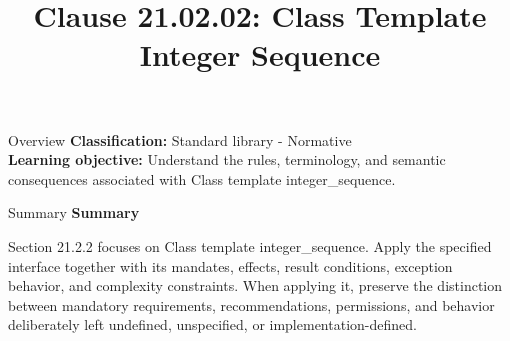 \documentclass[10pt,letterpaper]{article}
\title{Clause 21.02.02: Class Template Integer Sequence}
\author{}
\date{}
\begin{document}
\maketitle
\begin{CornellOverviewBox}{Overview}
\textbf{Classification:} Standard library - Normative\\[2pt]
\textbf{Learning objective:} Understand the rules, terminology, and semantic consequences associated with Class template integer\_sequence.
\end{CornellOverviewBox}\begin{CornellSummaryBox}{Summary}
{\sffamily\bfseries\color{Accent} Summary}\par\vspace{3pt}Section 21.2.2 focuses on Class template integer\_sequence. Apply the specified interface together with its mandates, effects, result conditions, exception behavior, and complexity constraints. When applying it, preserve the distinction between mandatory requirements, recommendations, permissions, and behavior deliberately left undefined, unspecified, or implementation-defined.
\end{CornellSummaryBox}
\end{document}
